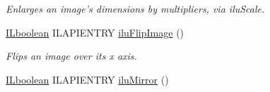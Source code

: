 \begin{DoxyCompactItemize}
\begin{DoxyCompactList}\small\item\em Enlarges an image's dimensions by multipliers, via ilu\+Scale. \end{DoxyCompactList}\item 
\hypertarget{group__ilu__geometry_ga102b4491bacd9ac35795351150f6afa1}{\hyperlink{group__il__types_gaa6aa7c95cfdc06b4d8601ef832b7bb0a}{I\+Lboolean} I\+L\+A\+P\+I\+E\+N\+T\+R\+Y \hyperlink{group__ilu__geometry_ga102b4491bacd9ac35795351150f6afa1}{ilu\+Flip\+Image} ()}\label{group__ilu__geometry_ga102b4491bacd9ac35795351150f6afa1}

\begin{DoxyCompactList}\small\item\em Flips an image over its x axis. \end{DoxyCompactList}\item 
\hypertarget{group__ilu__geometry_ga34ba55cb258ff33ab1e987a893a83c3c}{\hyperlink{group__il__types_gaa6aa7c95cfdc06b4d8601ef832b7bb0a}{I\+Lboolean} I\+L\+A\+P\+I\+E\+N\+T\+R\+Y \hyperlink{group__ilu__geometry_ga34ba55cb258ff33ab1e987a893a83c3c}{ilu\+Mirror} ()}\label{group__ilu__geometry_ga34ba55cb258ff33ab1e987a893a83c3c}


\end{DoxyCompactItemize}
